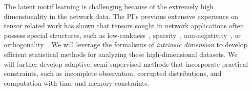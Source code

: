 \documentclass[10pt]{article}
\DeclareRobustCommand{\mybox}[2][gray!20]{%
\begin{tcolorbox}[   %
        breakable,
        left=0pt,
        right=0pt,
        top=0pt,
        bottom=0pt,
        colback=#1,
        colframe=#1,
        width=\dimexpr\textwidth\relax, 
        enlarge left by=0mm,
        boxsep=5pt,
        arc=0pt,outer arc=0pt,
        ]
        #2
\end{tcolorbox}
}
\theoremstyle{plain}
\theoremstyle{definition}
\begin{document}
The latent motif learning is challenging because of the extremely high dimensionality in the network data. The PI's previous extensive experience on tensor related work has shown that tensors sought in network applications often possess special structures, such as low-rankness~\cite{wang2017operator,wang2020learning,lee2021beyond}, sparsity~\cite{wang2018two}, non-negativity~\cite{wang2019three}, or orthogonality~\cite{wang2017tensor}. We will leverage the formalisms of \emph{intrinsic dimension} to develop efficient statistical methods for analyzing these high-dimensional datasets. We will further develop adaptive, semi-supervised methods that incorporate practical constraints, such as incomplete observation, corrupted distributions, and computation with time and memory constraints. 



\end{document}
